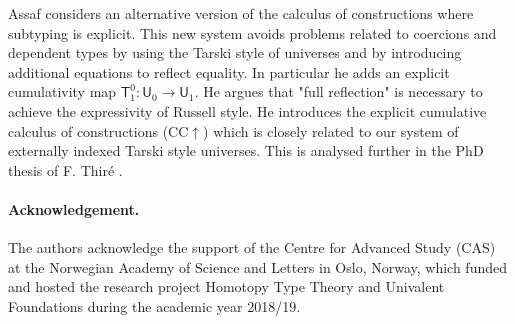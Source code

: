 \documentclass[11pt,a4paper]{article}
\theoremstyle{definition}
\def\UU{\mathsf{U}}
\newcommand{\T}{\mathsf{T}}
\begin{document}

Assaf \cite{Assaf14} considers an alternative version of the calculus of
constructions where subtyping is explicit. This new system avoids problems related to coercions and dependent types by using the Tarski style
of universes and by introducing additional equations to reflect equality. In particular he adds an explicit cumulativity map $\T^0_1 : \UU_0 \to \UU_1$. He argues that "full reflection" is necessary to achieve the expressivity of Russell style. He introduces the explicit cumulative calculus of constructions (CC$\uparrow$) which is closely related to our system of externally indexed Tarski style universes.
This is analysed further in the PhD thesis of F. Thir\'e \cite{Thire20}.

\paragraph{Acknowledgement.}
The authors acknowledge the support of the Centre for Advanced Study (CAS)
at the Norwegian Academy of Science and Letters
in Oslo, Norway, which funded and hosted the research project Homotopy
Type Theory and Univalent Foundations during the academic year 2018/19.


\end{document}
